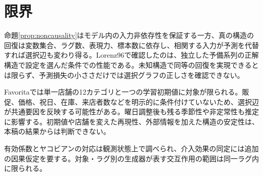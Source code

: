 \section{限界}
\label{sec:limitations}
命題\ref{prop:noncausality}はモデル内の入力非依存性を保証する一方、真の構造の回復は変数集合、ラグ数、表現力、標本数に依存し、相関する入力が予測を代替すれば選択辺も変わり得る。Lorenz96で確認したのは、独立した予備系列の正解構造で設定を選んだ条件での性能である。未知構造で同等の回復を実現できるとは限らず、予測損失の小ささだけでは選択グラフの正しさを確認できない。

Favoritaでは単一店舗の12カテゴリと一つの学習初期値に対象が限られる。販促、価格、祝日、在庫、来店者数などを明示的に条件付けていないため、選択辺が共通要因を反映する可能性がある。曜日調整後も残る季節性や非定常性も推定に影響する。初期値や店舗を変えた再現性、外部情報を加えた構造の安定性は、本稿の結果からは判断できない。

有効係数とヤコビアンの対応は観測状態上で調べられ、介入効果の同定には追加の因果仮定を要する。対象・ラグ別の生成器が表す交互作用の範囲は同一ラグ内に限られる。
